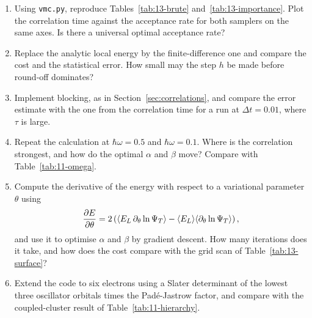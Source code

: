 \begin{enumerate}
  \item[a)] Using \texttt{vmc.py}, reproduce Tables~\ref{tab:13-brute}
  and~\ref{tab:13-importance}.  Plot the correlation time against the
  acceptance rate for both samplers on the same axes.  Is there a universal
  optimal acceptance rate?
  \item[b)] Replace the analytic local energy by the finite-difference one and
  compare the cost and the statistical error.  How small may the step $h$ be
  made before round-off dominates?
  \item[c)] Implement blocking, as in Section~\ref{sec:correlations}, and
  compare the error estimate with the one from the correlation time for a run
  at $\Delta t=0.01$, where $\tau$ is large.
  \item[d)] Repeat the calculation at $\hbar\omega=0.5$ and $\hbar\omega=0.1$.
  Where is the correlation strongest, and how do the optimal $\alpha$ and
  $\beta$ move?  Compare with Table~\ref{tab:11-omega}.
  \item[e)] Compute the derivative of the energy with respect to a variational
  parameter $\theta$ using
  \[
    \frac{\partial E}{\partial\theta}
     = 2\left(\langle E_L\,\partial_\theta\ln\Psi_T \rangle
       - \langle E_L \rangle\langle \partial_\theta\ln\Psi_T \rangle\right),
  \]
  and use it to optimise $\alpha$ and $\beta$ by gradient descent.  How many
  iterations does it take, and how does the cost compare with the grid scan of
  Table~\ref{tab:13-surface}?
  \item[f)] Extend the code to six electrons using a Slater determinant of the
  lowest three oscillator orbitals times the Pad\'e-Jastrow factor, and
  compare with the coupled-cluster result of
  Table~\ref{tab:11-hierarchy}.
\end{enumerate}

